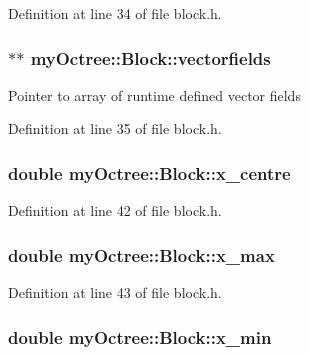 Definition at line 34 of file block.\+h.

\hypertarget{classmy_octree_1_1_block_ad8c28f5d7cd66ac20dc34643d821ce3b}{}
\subsubsection[{vectorfields}]{$\ast$$\ast$ my\+Octree\+::\+Block\+::vectorfields}\label{classmy_octree_1_1_block_ad8c28f5d7cd66ac20dc34643d821ce3b}
Pointer to array of runtime defined vector fields 

Definition at line 35 of file block.\+h.

\hypertarget{classmy_octree_1_1_block_a568b599d56f024effe48021075cdde64}{}
\subsubsection[{x\+\_\+centre}]{\setlength{\rightskip}{0pt plus 5cm}double my\+Octree\+::\+Block\+::x\+\_\+centre}\label{classmy_octree_1_1_block_a568b599d56f024effe48021075cdde64}


Definition at line 42 of file block.\+h.

\hypertarget{classmy_octree_1_1_block_a2d236fad939b4acef0fec4fedfcef128}{}
\subsubsection[{x\+\_\+max}]{\setlength{\rightskip}{0pt plus 5cm}double my\+Octree\+::\+Block\+::x\+\_\+max}\label{classmy_octree_1_1_block_a2d236fad939b4acef0fec4fedfcef128}


Definition at line 43 of file block.\+h.

\hypertarget{classmy_octree_1_1_block_a333185a8f7b5f2b4f425e08459caeca4}{}
\subsubsection[{x\+\_\+min}]{\setlength{\rightskip}{0pt plus 5cm}double my\+Octree\+::\+Block\+::x\+\_\+min}\label{classmy_octree_1_1_block_a333185a8f7b5f2b4f425e08459caeca4}


